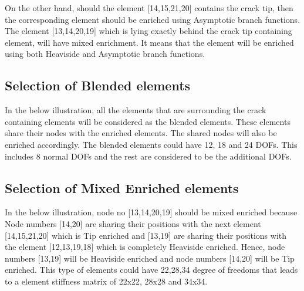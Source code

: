 \documentclass[fleqn, 12.5pt,a4paper]{report}
\begin{document}
On the other hand, should the element [14,15,21,20] contains the crack tip, then the corresponding element should be enriched using Asymptotic branch functions\cite{pandey2019new}. The element [13,14,20,19] which is lying exactly behind the crack tip containing element, will have mixed enrichment\cite{khoei2014extended}. It means that the element will be enriched using both Heaviside and Asymptotic branch functions.

\subsection{\color{Black} {Selection of Blended elements}}
In the below illustration, all the elements that are surrounding the crack containing elements will be considered as the blended elements\cite{khoei2014extended}. These elements share their nodes with the enriched elements. The shared nodes will also be enriched accordingly. The blended elements could have 12, 18 and 24 DOFs. This includes 8 normal DOFs and the rest are considered to be the additional DOFs. 

\subsection{\color{Black} {Selection of Mixed Enriched elements}}
In the below illustration, node no [13,14,20,19] should be mixed enriched because Node numbers [14,20] are sharing their positions with the next element [14,15,21,20] which is Tip enriched and [13,19] are sharing their positions with the element [12,13,19,18] which is completely Heaviside enriched. Hence, node numbers [13,19] will be Heaviside enriched and node numbers [14,20] will be Tip enriched. This type of elements could have 22,28,34 degree of freedoms that leads to a element stiffness matrix of 22x22, 28x28 and 34x34.
\end{document}
